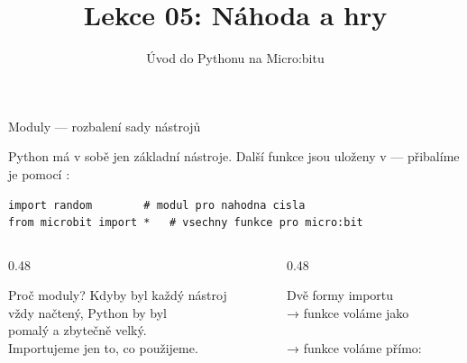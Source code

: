 

\title{Lekce 05: Náhoda a hry}
\subtitle{Úvod do Pythonu na Micro:bitu}
\date{}



\begin{frame}
  \titlepage
\end{frame}

\begin{frame}[fragile]{Moduly — rozbalení sady nástrojů}

  Python má v sobě jen základní nástroje.
  Další funkce jsou uloženy v  — přibalíme je pomocí :

  \bigskip
  \begin{lstlisting}
import random        # modul pro nahodna cisla
from microbit import *   # vsechny funkce pro micro:bit
  \end{lstlisting}

  \bigskip
  \begin{columns}[T]
    \begin{column}{0.48\textwidth}
      \begin{block}{Proč moduly?}
        Kdyby byl každý nástroj\\ vždy načtený, Python by byl\\
        pomalý a zbytečně velký.\\
        Importujeme jen to, co použijeme.
      \end{block}
    \end{column}
    \begin{column}{0.48\textwidth}
      \begin{block}{Dvě formy importu}
        \\
        → funkce voláme jako \\[6pt]
        \\
        → funkce voláme přímo: 
      \end{block}
    \end{column}
  \end{columns}
\end{frame}

